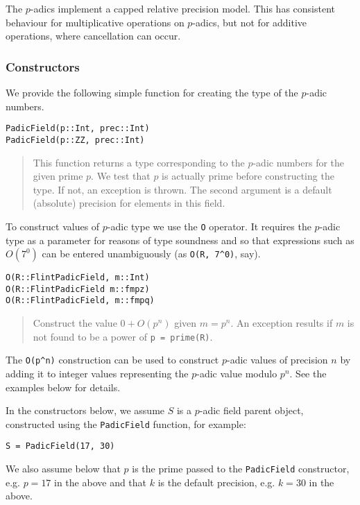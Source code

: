 \documentclass[a4paper,10pt]{article}
\newcommand{\code}{\lstinline}
\newcommand{\desc}[1]{\vspace{-3mm}\begin{quote}#1\end{quote}}
\begin{document}
{{The $p$-adics implement a capped relative precision model. This has consistent
behaviour for multiplicative operations on $p$-adics, but not for additive
operations, where cancellation can occur.

\subsubsection{Constructors}

We provide the following simple function for creating the type of the $p$-adic
numbers.

\begin{lstlisting}
PadicField(p::Int, prec::Int)
PadicField(p::ZZ, prec::Int)
\end{lstlisting}

\desc{This function returns a type corresponding to the $p$-adic numbers for
the given prime $p$. We test that $p$ is actually prime before constructing
the type. If not, an exception is thrown. The second argument is a default
(absolute) precision for elements in this field.}

To construct values of $p$-adic type we use the \code{O} operator. It requires
the $p$-adic type as a parameter for reasons of type soundness and so that
expressions such as $O(7^0)$ can be entered unambiguously (as \code{O(R, 7^0)},
say).

\begin{lstlisting}
O(R::FlintPadicField, m::Int)
O(R::FlintPadicField m::fmpz)
O(R::FlintPadicField, m::fmpq)
\end{lstlisting}

\desc{Construct the value $0 + O(p^n)$ given $m = p^n$. An exception results
if $m$ is not found to be a power of \code{p = prime(R)}.}

The \code{O(p^n)} construction can be used to construct $p$-adic values of
precision $n$ by adding it to integer values representing the $p$-adic value
modulo $p^n$. See the examples below for details.

In the constructors below, we assume $S$ is a $p$-adic field parent object,
constructed using the \code{PadicField} function, for example:

\begin{lstlisting}
S = PadicField(17, 30)
\end{lstlisting}

We also assume below that $p$ is the prime passed to the \code{PadicField}
constructor, e.g. $p = 17$ in the above and that $k$ is the default precision,
e.g. $k = 30$ in the above.

}}
\end{document}
